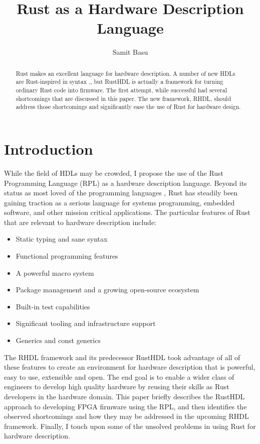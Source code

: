 \documentclass[sigplan,screen,sigconf]{acmart}
\author{Samit Basu}
\affiliation{
  basu.samit@gmail.com
  \country{Fremont CA, USA}
}
\begin{document}
\title{Rust as a Hardware Description Language}

\begin{abstract}
Rust \cite{b9} makes an excellent language for hardware description.  A number of new HDLs are 
Rust-inspired in syntax \cite{b1},\cite{b4},
but RustHDL\cite{b6} is actually a framework for turning ordinary Rust code into firmware.  The first attempt,
while successful had several shortcomings that are discussed in this paper.  The new framework, RHDL\cite{b10},
should address those shortcomings and significantly ease the use of Rust for hardware design.
\end{abstract}

\maketitle

\section{Introduction}

While the field of HDLs may be crowded, I propose the use of the Rust Programming Language (RPL)
as a hardware description language.  Beyond its status as most loved of the programming languages \cite{b0},
Rust has steadily been gaining traction as a serious language for systems programming, embedded 
software, and other mission critical applications.  The particular features of Rust that are 
relevant to hardware description include:
\begin{itemize}
\item Static typing and sane syntax
\item Functional programming features
\item A powerful macro system
\item Package management and a growing open-source ecosystem
\item Built-in test capabilities
\item Significant tooling and infrastructure support
\item Generics and const generics
\end{itemize}
The RHDL framework and its predecessor RustHDL took advantage of all of these features to
create an environment for hardware description that is powerful, easy to use, extensible and
open.  The end goal is to enable a wider class of engineers to develop high quality hardware
by reusing their skills as Rust developers in the hardware domain.  This paper briefly describes
the RustHDL approach to developing FPGA firmware using the RPL, and then identifies the
observed shortcomings and how they may be addressed in the upcoming RHDL framework.  
Finally, I touch upon some of the unsolved problems in using Rust for hardware description.
\end{document}
